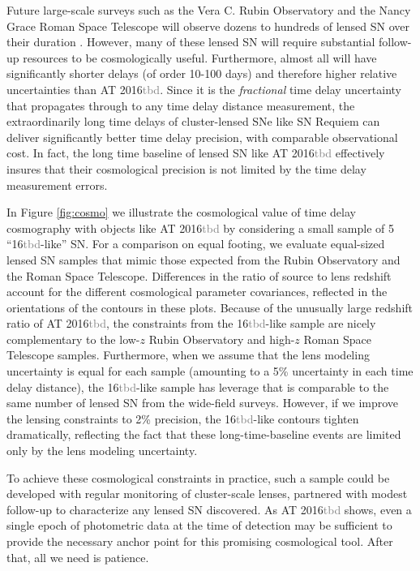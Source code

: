 \documentclass[12pt,dvipsnames]{article}
\def\SNABC{AT 2016{\textcolor{Gray}{tbd}}\xspace}
\def\reqlike{16{\textcolor{Gray}{tbd}}-like\xspace}
\begin{document}
Future large-scale surveys such as the Vera C. Rubin Observatory 
and the Nancy Grace Roman Space Telescope will observe dozens to hundreds of lensed SN over their duration \cite{oguri_gravitationally_2010,goldstein_rates_2019,wojtak_magnified_2019}. However, many of these lensed SN will require substantial follow-up resources to be cosmologically useful. Furthermore, almost all will have significantly shorter 
delays (of order 10-100 days) and therefore higher relative uncertainties than \SNABC.  Since it is the {\it fractional} time delay uncertainty that 
propagates through to any time delay distance measurement, the extraordinarily long time delays of cluster-lensed SNe like SN Requiem can deliver significantly better time delay precision, with comparable observational cost.  In fact, the long time baseline of lensed SN like \SNABC effectively insures that their cosmological precision is not limited by the time delay measurement errors.  

In Figure \ref{fig:cosmo} we illustrate the cosmological value of time delay cosmography with objects like \SNABC  by considering a small sample of 5 ``\reqlike'' SN.  For a comparison on equal footing, we evaluate equal-sized lensed SN samples 
that mimic those expected from the Rubin Observatory and  the Roman Space Telescope.  Differences in the 
ratio of source to lens redshift account for the different cosmological parameter covariances, reflected in the orientations of the contours in these plots. Because of the unusually large redshift ratio of \SNABC, the constraints 
from the \reqlike sample are nicely complementary to the low-$z$ Rubin Observatory and high-$z$ Roman Space Telescope samples. 
Furthermore, when we assume that the lens modeling uncertainty is equal for each sample (amounting to a 5\% uncertainty in each time delay distance), the \reqlike sample has leverage that is comparable to the same number of lensed SN from the wide-field surveys. However, if we improve  the lensing constraints to 2\% precision, the \reqlike contours tighten dramatically, reflecting the fact that these long-time-baseline events are limited only by the lens modeling uncertainty.


To achieve these cosmological constraints in practice, such a sample could be developed with regular monitoring of cluster-scale lenses, partnered with modest follow-up to characterize any lensed SN discovered.  As \SNABC shows, even a single epoch of photometric data at the time of detection may be sufficient to provide the necessary anchor point for this promising cosmological tool.  After that, all we need is patience.
\end{document}
